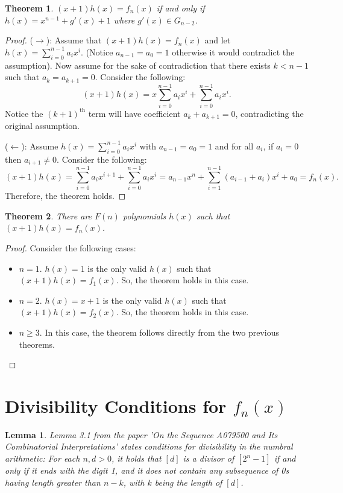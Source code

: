 \documentclass{article}
\newtheorem{theorem}{Theorem}[section]
\newtheorem{lemma}{Lemma}[section]
\begin{document}
    \begin{theorem}
        $(x+1)h(x) = f_n(x)$ if and only if $h(x) = x^{n-1} + g'(x)+1$ where $g'(x) \in G_{n-2}$.
    \end{theorem}
    \begin{proof}
        ($\rightarrow$): Assume that $(x+1)h(x) = f_n(x)$ and let $h(x) = \sum_{i=0}^{n-1} a_i x^i$.
        (Notice $a_{n-1} = a_0 = 1$ otherwise it would contradict the assumption). Now assume
        for the sake of contradiction that there exists $k < n-1$ such that $a_k = a_{k+1} = 0$.
        Consider the following:
        $$(x+1)h(x) = x \sum_{i=0}^{n-1} a_i x^i + \sum_{i=0}^{n-1} a_i x^i.$$
        Notice the $(k+1)^{\text{th}}$ term will have coefficient $a_k + a_{k+1} = 0$,
        contradicting the original assumption.

        ($\leftarrow$): Assume $h(x) = \sum_{i=0}^{n-1} a_i x^i$ with $a_{n-1} = a_0 = 1$ and for
        all $a_i$, if $a_i=0$ then $a_{i+1} \neq 0$. Consider the following:
        $$(x+1)h(x) = \sum_{i=0}^{n-1} a_i x^{i+1} + \sum_{i=0}^{n-1} a_i x^i = a_{n-1}x^n + \sum_{i=1}^{n-1}(a_{i-1}+a_i)x^i + a_0 = f_n(x).$$
        Therefore, the theorem holds.
    \end{proof}

    \begin{theorem}
        There are $F(n)$ polynomials $h(x)$ such that $(x+1)h(x) = f_n(x)$.
    \end{theorem}
    \begin{proof}
        Consider the following cases:
        \begin{itemize}
            \item $n = 1$. $h(x) = 1$ is the only valid $h(x)$ such that $(x+1)h(x) = f_1(x)$.
            So, the theorem holds in this case.
            \item $n = 2$. $h(x) = x+1$ is the only valid $h(x)$ such that $(x+1)h(x) = f_2(x)$.
            So, the theorem holds in this case.
            \item $n \geq 3$. In this case, the theorem follows directly from the two previous theorems.
        \end{itemize}
    \end{proof}

    \section{Divisibility Conditions for $f_n(x)$}
    \begin{lemma}
        Lemma 3.1 from the paper 'On the Sequence A079500 and Its Combinatorial Interpretations'
        states conditions for divisibility in the numbral arithmetic: For each $n, d > 0$,
        it holds that $[d]$ is a divisor of $[2^n - 1]$ if and only if it ends with the digit 1,
        and it does not contain any subsequence of 0s having length greater than $n-k$, with $k$
        being the length of $[d]$.
    \end{lemma}
\end{document}
